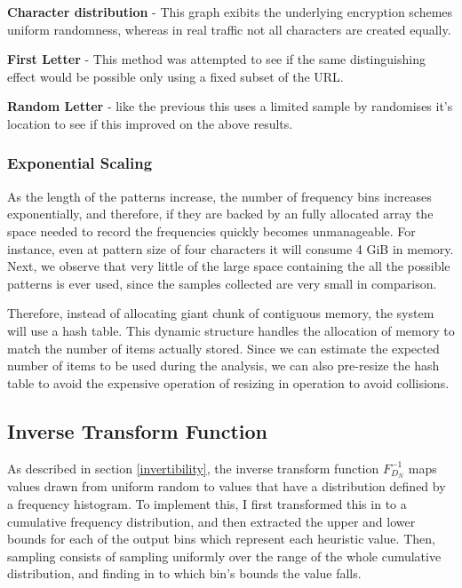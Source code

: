 \documentclass[ %
                    author={Samuel Russell},
                supervisor={Prof. Bogdan Warinschi},
                    degree={MEng},
                     title={Innocuous Ciphertexts},
                  subtitle={The DE-CENSOR Scheme},
                      type={research},
                      year={2018} ]{dissertation}
\begin{document}
\textbf{Character distribution} - This graph exibits the underlying encryption schemes uniform randomness, whereas in real traffic not all characters are created equally.

\textbf{First Letter} - This method was attempted to see if the same distinguishing effect would be possible only using a fixed subset of the URL.

\textbf{Random Letter} - like the previous this uses a limited sample by randomises it's location to see if this improved on the above results.

\subsubsection{Exponential Scaling}

As the length of the patterns increase, the number of frequency bins increases exponentially, and therefore, if they are backed by an fully allocated array the space needed to record the frequencies quickly becomes unmanageable.
For instance, even at pattern size of four characters it will consume 4 GiB in memory.
Next, we observe that very little of the large space containing the all the possible patterns is ever used, since the samples collected are very small in comparison.

Therefore, instead of allocating giant chunk of contiguous memory, the system will use a hash table.
This dynamic structure handles the allocation of memory to match the number of items actually stored.
Since we can estimate the expected number of items to be used during the analysis, we can also pre-resize the hash table to avoid the expensive operation of resizing in operation to avoid collisions.

\subsection{Inverse Transform Function}

As described in section \ref{invertibility}, the inverse transform function $F^{-1}_{D_N}$ maps values drawn from uniform random to values that have a distribution defined by a frequency histogram.
To implement this, I first transformed this in to a cumulative frequency distribution, and then extracted the upper and lower bounds for each of the output bins which represent each heuristic value.
Then, sampling consists of sampling uniformly over the range of the whole cumulative distribution, and finding in to which bin's bounds the value falls.
\end{document}
